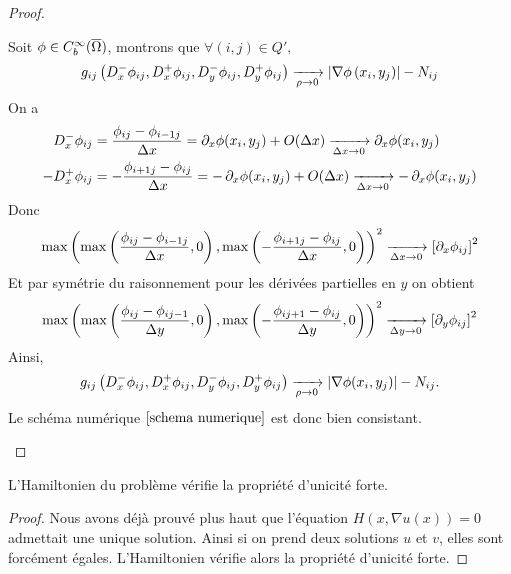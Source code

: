 \begin{proof}
\begin{enumerate}
        Soit $\phi \in C^{\infty}_b(\overline{\Omega})$, montrons que $\forall (i,j)\in Q',$ 
        \begin{equation*}
            g_{ij}\left(D_x^-\phi_{ij},D_x^+\phi_{ij},D_y^-\phi_{ij},D_y^+\phi_{ij}\right) \xrightarrow[\rho \rightarrow 0]{} \mathopen{}\left|\nabla \phi\left(x_i,y_j\right)\right|\mathclose{}-N_{ij}
        \end{equation*}
        On a 
        \begin{equation*}
            \begin{split}
                D_x^-\phi_{ij} &= \frac{\phi_{ij}-\phi_{i-1j}}{\Delta x} = \mathop{}\!{\partial}_x \phi(x_i,y_j) + O(\Delta x) \xrightarrow[\Delta x \rightarrow 0] {}\mathop{}\!{\partial}_x\phi(x_i,y_j)\\
                -D_x^+\phi_{ij} &= -\frac{\phi_{i+1j}-\phi_{ij}}{\Delta x} = -\mathop{}\!{\partial}_x \phi(x_i,y_j) + O(\Delta x) \xrightarrow[\Delta x \rightarrow 0] {}-\mathop{}\!{\partial}_x\phi(x_i,y_j)
            \end{split}
        \end{equation*}
        Donc 
        \begin{equation*}
            \max\left(\max\left(\dfrac{\phi_{ij} - \phi_{i-1j}}{\Delta x},0\right),\max\left(-\dfrac{\phi_{i+1j} - \phi_{ij}}{\Delta x},0\right)\right)^2 \xrightarrow[\Delta x \rightarrow 0]{} \left[ \mathop{}\!{\partial}_x \phi_{ij}\right]^2
        \end{equation*}
        Et par symétrie du raisonnement pour les dérivées partielles en $y$ on obtient 
        \begin{equation*}
            \max\left(\max\left(\dfrac{\phi_{ij} - \phi_{ij-1}}{\Delta y},0\right),\max\left(-\dfrac{\phi_{ij+1} - \phi_{ij}}{\Delta y},0\right)\right)^2 \xrightarrow[\Delta y \rightarrow 0]{} \left[ \mathop{}\!{\partial}_y \phi_{ij}\right]^2
        \end{equation*}
        Ainsi, 
        \begin{equation*}
            g_{ij}\left(D_x^-\phi_{ij},D_x^+\phi_{ij},D_y^-\phi_{ij},D_y^+\phi_{ij}\right) \xrightarrow[\rho \rightarrow 0]{} \mathopen{}\left|\nabla \phi(x_i,y_j)\right|\mathclose{}-N_{ij}.
        \end{equation*}
        Le schéma numérique $\eqref{schema numerique}$ est donc bien consistant.
    \end{enumerate}
\end{proof}

\begin{proposition}
    L'Hamiltonien du problème vérifie la propriété d'unicité forte.
\end{proposition}
\begin{proof}
    Nous avons déjà prouvé plus haut que l'équation $H(x,\nabla u(x))=0$ admettait une unique solution. Ainsi si on prend deux solutions $u$ et $v$, elles sont forcément égales. L'Hamiltonien vérifie alors la propriété d'unicité forte.
\end{proof}

